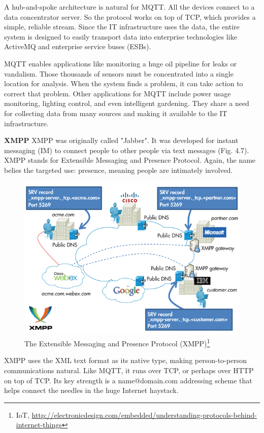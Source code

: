       A hub-and-spoke architecture is natural for MQTT. All the devices connect to a data concentrator server. So the protocol works on top of TCP, which provides a simple, reliable stream. Since the IT infrastructure uses the data, the entire system is designed to easily transport data into enterprise technologies like ActiveMQ and enterprise service buses (ESBs).

      MQTT enables applications like monitoring a huge oil pipeline for leaks or vandalism. Those thousands of sensors must be concentrated into a single location for analysis. When the system finds a problem, it can take action to correct that problem. Other applications for MQTT include power usage monitoring, lighting control, and even intelligent gardening. They share a need for collecting data from many sources and making it available to the IT infrastructure.

     \textbf{XMPP}
      \newline 
      XMPP was originally called "Jabber". It was developed for instant messaging (IM) to connect people to other people via text messages (Fig. 4.7). XMPP stands for Extensible Messaging and Presence Protocol. Again, the name belies the targeted use: presence, meaning people are intimately involved.
      \begin{figure}[!ht]
      \centering
      \includegraphics[scale=0.7]{images/XMPP.png}   
      \caption[The Extensible Messaging and Presence Protocol (XMPP)]{The Extensible Messaging and Presence Protocol (XMPP)\footnote{IoT, \url{http://electronicdesign.com/embedded/understanding-protocols-behind-internet-things}}}
      \label{img:XMPP}                           
      \end{figure}
      XMPP uses the XML text format as its native type, making person-to-person communications natural. Like MQTT, it runs over TCP, or perhaps over HTTP on top of TCP. Its key strength is a name@domain.com addressing scheme that helps connect the needles in the huge Internet haystack.

